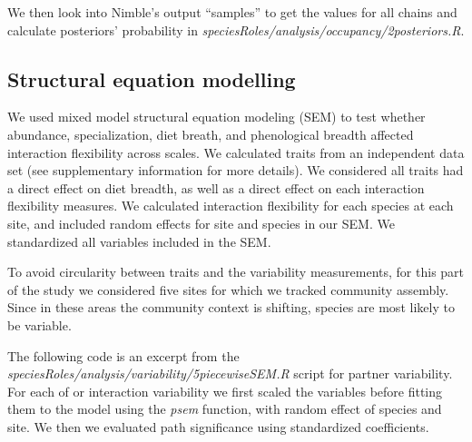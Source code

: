 \documentclass[
]{article}
\newenvironment{Shaded}{\begin{snugshade}}{\end{snugshade}}
\newcommand{\CommentTok}[1]{\textcolor[rgb]{0.56,0.35,0.01}{\textit{#1}}}
\newcommand{\NormalTok}[1]{#1}
\newcommand{\OperatorTok}[1]{\textcolor[rgb]{0.81,0.36,0.00}{\textbf{#1}}}
\begin{document}
We then look into Nimble's output ``samples'' to get the values for all
chains and calculate posteriors' probability in
\emph{speciesRoles/analysis/occupancy/2posteriors.R}.

\begin{Shaded}
\end{Shaded}

\hypertarget{structural-equation-modelling}{%
\subsection{Structural equation
modelling}\label{structural-equation-modelling}}

We used mixed model structural equation modeling (SEM) to test whether
abundance, specialization, diet breath, and phenological breadth
affected interaction flexibility across scales. We calculated traits
from an independent data set (see supplementary information for more
details). We considered all traits had a direct effect on diet breadth,
as well as a direct effect on each interaction flexibility measures. We
calculated interaction flexibility for each species at each site, and
included random effects for site and species in our SEM. We standardized
all variables included in the SEM.

To avoid circularity between traits and the variability measurements,
for this part of the study we considered five sites for which we tracked
community assembly. Since in these areas the community context is
shifting, species are most likely to be variable.

The following code is an excerpt from the
\emph{speciesRoles/analysis/variability/5piecewiseSEM.R} script for
partner variability. For each of or interaction variability we first
scaled the variables before fitting them to the model using the
\emph{psem} function, with random effect of species and site. We then we
evaluated path significance using standardized coefficients.
\end{document}
